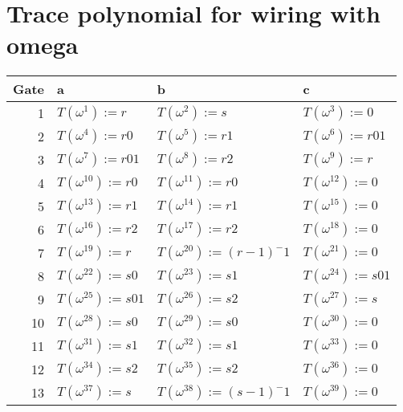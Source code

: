 \documentclass[11pt]{article}
\begin{document}
\section{Trace polynomial for wiring with omega}
\label{sec:org836884f}
\begin{center}
\begin{tabular}{rlll}
Gate & a & b & c\\[0pt]
\hline
1 & \(T(\omega^1) := r\) & \(T(\omega^2):=s\) & \(T(\omega^3) :=  0\)\\[0pt]
2 & \(T(\omega^4) := r0\) & \(T(\omega^5):=r1\) & \(T(\omega^6) := r01\)\\[0pt]
3 & \(T(\omega^7) := r01\) & \(T(\omega^8) := r2\) & \(T(\omega^9) := r\)\\[0pt]
4 & \(T(\omega^{10}) := r0\) & \(T(\omega^{11}) := r0\) & \(T(\omega^{12}) := 0\)\\[0pt]
5 & \(T(\omega^{13}) := r1\) & \(T(\omega^{14}) := r1\) & \(T(\omega^{15}) := 0\)\\[0pt]
6 & \(T(\omega^{16}) := r2\) & \(T(\omega^{17}) := r2\) & \(T(\omega^{18}) := 0\)\\[0pt]
7 & \(T(\omega^{19}) := r\) & \(T(\omega^{20}) := (r-1)^-1\) & \(T(\omega^{21}) := 0\)\\[0pt]
8 & \(T(\omega^{22}) := s0\) & \(T(\omega^{23}) := s1\) & \(T(\omega^{24}) := s01\)\\[0pt]
9 & \(T(\omega^{25}) := s01\) & \(T(\omega^{26}) := s2\) & \(T(\omega^{27}) := s\)\\[0pt]
10 & \(T(\omega^{28}) := s0\) & \(T(\omega^{29}) := s0\) & \(T(\omega^{30}) := 0\)\\[0pt]
11 & \(T(\omega^{31}) := s1\) & \(T(\omega^{32}) := s1\) & \(T(\omega^{33}) := 0\)\\[0pt]
12 & \(T(\omega^{34}) := s2\) & \(T(\omega^{35}) := s2\) & \(T(\omega^{36}) := 0\)\\[0pt]
13 & \(T(\omega^{37}) := s\) & \(T(\omega^{38}) := (s-1)^-1\) & \(T(\omega^{39}) := 0\)\\[0pt]
\hline
\end{tabular}
\end{center}
\end{document}
